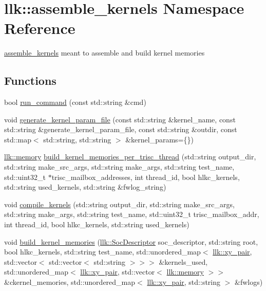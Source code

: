\hypertarget{namespacellk_1_1assemble__kernels}{}\section{llk\+:\+:assemble\+\_\+kernels Namespace Reference}
\label{namespacellk_1_1assemble__kernels}


\hyperlink{namespacellk_1_1assemble__kernels}{assemble\+\_\+kernels} meant to assemble and build kernel memories  


\subsection*{Functions}
\begin{DoxyCompactItemize}
\item 
bool \hyperlink{namespacellk_1_1assemble__kernels_a5216f630a6ff0cb75b43ebf8adf1a93e}{run\+\_\+command} (const std\+::string \&cmd)
\item 
void \hyperlink{namespacellk_1_1assemble__kernels_a188966c139ddbc16fe641bcb1fc73daa}{generate\+\_\+kernel\+\_\+param\+\_\+file} (const std\+::string \&kernel\+\_\+name, const std\+::string \&generate\+\_\+kernel\+\_\+param\+\_\+file, const std\+::string \&outdir, const std\+::map$<$ std\+::string, std\+::string $>$ \&kernel\+\_\+params=\{\})
\item 
\hyperlink{classllk_1_1memory}{llk\+::memory} \hyperlink{namespacellk_1_1assemble__kernels_a0c64d9c4bdd026cef18dbede1e95f601}{build\+\_\+kernel\+\_\+memories\+\_\+per\+\_\+trisc\+\_\+thread} (std\+::string output\+\_\+dir, std\+::string make\+\_\+src\+\_\+args, std\+::string make\+\_\+args, std\+::string test\+\_\+name, std\+::uint32\+\_\+t $\ast$trisc\+\_\+mailbox\+\_\+addresses, int thread\+\_\+id, bool hlkc\+\_\+kernels, std\+::string used\+\_\+kernels, std\+::string \&fwlog\+\_\+string)
\item 
void \hyperlink{namespacellk_1_1assemble__kernels_ac86be485d5e20c3e05809d2f00e63cfd}{compile\+\_\+kernels} (std\+::string output\+\_\+dir, std\+::string make\+\_\+src\+\_\+args, std\+::string make\+\_\+args, std\+::string test\+\_\+name, std\+::uint32\+\_\+t trisc\+\_\+mailbox\+\_\+addr, int thread\+\_\+id, bool hlkc\+\_\+kernels, std\+::string used\+\_\+kernels)
\item 
void \hyperlink{namespacellk_1_1assemble__kernels_a7aa5c5270196ee870fd874bc6c5b30aa}{build\+\_\+kernel\+\_\+memories} (\hyperlink{structllk_1_1SocDescriptor}{llk\+::\+Soc\+Descriptor} soc\+\_\+descriptor, std\+::string root, bool hlkc\+\_\+kernels, std\+::string test\+\_\+name, std\+::unordered\+\_\+map$<$ \hyperlink{structllk_1_1xy__pair}{llk\+::xy\+\_\+pair}, std\+::vector$<$ std\+::vector$<$ std\+::string $>$$>$$>$ \&kernels\+\_\+used, std\+::unordered\+\_\+map$<$ \hyperlink{structllk_1_1xy__pair}{llk\+::xy\+\_\+pair}, std\+::vector$<$ \hyperlink{classllk_1_1memory}{llk\+::memory} $>$$>$ \&ckernel\+\_\+memories, std\+::unordered\+\_\+map$<$ \hyperlink{structllk_1_1xy__pair}{llk\+::xy\+\_\+pair}, std\+::string $>$ \&fwlogs)
\end{DoxyCompactItemize}


